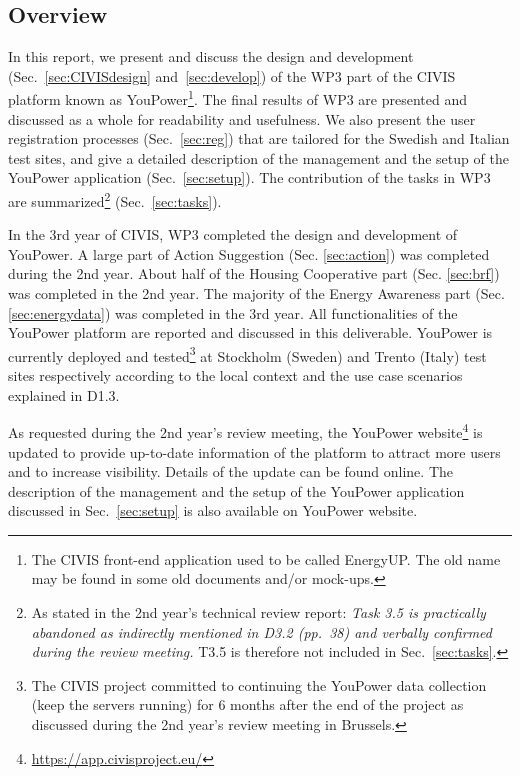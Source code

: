 \subsection{Overview}

In this report, we present and discuss the design and development (Sec.~\ref{sec:CIVISdesign} and~\ref{sec:develop}) of the WP3 part of the CIVIS platform known as YouPower\footnote{The CIVIS front-end application used to be called EnergyUP. The old name may be found in some old documents and/or mock-ups.}. 
The final results of WP3 are presented and discussed as a whole for readability and usefulness. 
% 
We also present the user registration processes (Sec.~\ref{sec:reg}) that are tailored for the Swedish and Italian test sites, and give a detailed description of the management and the setup of the YouPower application (Sec.~\ref{sec:setup}). The contribution of the tasks in WP3 are summarized\footnote{As stated in the 2nd year's technical review report: \textit{Task 3.5 is practically abandoned as indirectly mentioned in D3.2 (pp.~38) and verbally confirmed
during the review meeting.} T3.5 is therefore not included in Sec.~\ref{sec:tasks}.} (Sec.~\ref{sec:tasks}). 

In the 3rd year of CIVIS, WP3 completed the design and development of YouPower. A large part of Action Suggestion (Sec. \ref{sec:action}) was completed during the 2nd year. About half of the Housing Cooperative part (Sec. \ref{sec:brf}) was completed in the 2nd year. The majority of the Energy Awareness part (Sec. \ref{sec:energydata}) was completed in the 3rd year. 
All functionalities of the YouPower platform are reported and discussed in this deliverable. YouPower is currently deployed and tested\footnote{The CIVIS project committed to continuing the YouPower data collection (keep the servers running) for 6 months after the end of the project as discussed during the 2nd year's review meeting in Brussels.} at Stockholm (Sweden) and Trento (Italy) test sites respectively according to the local context and the use case scenarios explained in D1.3. 

As requested during the 2nd year's review meeting, the YouPower website\footnote{\url{https://app.civisproject.eu/}} is updated to provide  up-to-date information of the platform to attract more users and to increase visibility. Details of the update can be found online. The description of the management and the setup of the YouPower application discussed in Sec.~\ref{sec:setup} is also available on YouPower website.

